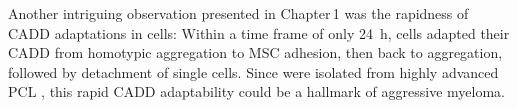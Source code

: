 \unnsubsection{\caddadaptabilitytitle}%
\label{sec:discussion_caddadaptability}%
Another intriguing observation presented in Chapter\,1 was the rapidness of
\ac{CADD} adaptations in \INA cells: Within a time frame of only \SI{24}{\hour},
\INA cells adapted their \ac{CADD} from homotypic aggregation to \ac{MSC}
adhesion, then back to aggregation, followed by detachment of single cells.
Since \INA were isolated from highly advanced \ac{PCL}
\cite{burgerGp130RasMediated2001}, this rapid \ac{CADD} adaptability could be a
hallmark of aggressive myeloma.














